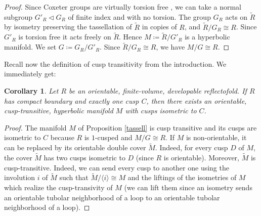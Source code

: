 \documentclass{amsart}
\newtheorem{cor}[lemma]{Corollary}
\theoremstyle{definition}
\theoremstyle{remark}
\newcommand{\matH} {\ensuremath {\mathbb{H}}}
\begin{document}
\begin{proof}

    Since Coxeter groups are virtually torsion free \cite[Corollary $D.1.4$]{D}, we can take a normal subgroup $G'_R\triangleleft G_R$ of finite index and with no torsion.
    The group $G_R$ acts on $\widetilde{R}$ by isometry preserving the tassellation of $\widetilde{R}$ in copies of $R$, and $\widetilde{R}/G_R\cong R$. %
    Since $G'_R$ is torsion free it acts freely on $\widetilde{R}$.
    Hence $M\coloneqq \widetilde{R}/G'_R$ is a hyperbolic manifold. We set $G\coloneqq G_R/G'_R$.
    Since $\widetilde{R}/G_R \cong R$, we have $M/G \cong R$.   
    \end{proof}


Recall now the definition of cusp transitivity from the introduction. We immediately get:

\begin{cor}
\label{maincor}
    Let $R$ be an orientable, finite-volume, developable reflectofold. If $R$ has compact boundary and exactly one cusp $C$, then there exists an orientable, cusp-transitive, hyperbolic manifold $M$ with cusps isometric to $C$. 
\end{cor}
\begin{proof}
    The manifold $M$ of Proposition \ref{tassell} is cusp transitive  and its cusps are isometric to $C$ because $R$ is $1$-cusped and $M/G \cong R$. If $M$ is non-orientable, it can be replaced by its orientable double cover $\widetilde{M}$. Indeed, for every cusp $D$ of $M$, the cover $\widetilde{M}$ has two cusps isometric to $D$ (since $R$ is orientable). Moreover, $\widetilde{M}$ is cusp-transitive. Indeed, we can send every cusp to another one using the involution $i$ of $\widetilde{M}$ such that $\widetilde{M}/\langle i \rangle\cong M$ and the liftings of the isometries of $M$ which realize the cusp-transivity of $M$ (we can lift them since an isometry sends an orientable tubolar neighborhood of a loop to an orientable tubolar neighborhood of a loop).
\end{proof}

\end{document}
